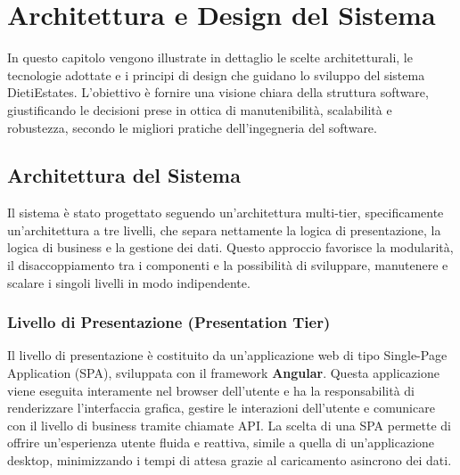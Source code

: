 \chapter{Architettura e Design del Sistema}
\label{cha:architettura_e_design_del_sistema}
In questo capitolo vengono illustrate in dettaglio le scelte architetturali, le tecnologie adottate e i principi di design che guidano lo sviluppo del sistema DietiEstates. L'obiettivo è fornire una visione chiara della struttura software, giustificando le decisioni prese in ottica di manutenibilità, scalabilità e robustezza, secondo le migliori pratiche dell'ingegneria del software.

\section{Architettura del Sistema}
\label{sec:architettura_del_sistema}
Il sistema è stato progettato seguendo un'architettura multi-tier, specificamente un'architettura a tre livelli, che separa nettamente la logica di presentazione, la logica di business e la gestione dei dati. Questo approccio favorisce la modularità, il disaccoppiamento tra i componenti e la possibilità di sviluppare, manutenere e scalare i singoli livelli in modo indipendente.

\subsection{Livello di Presentazione (Presentation Tier)}
Il livello di presentazione è costituito da un'applicazione web di tipo Single-Page Application (SPA), sviluppata con il framework \textbf{Angular}. Questa applicazione viene eseguita interamente nel browser dell'utente e ha la responsabilità di renderizzare l'interfaccia grafica, gestire le interazioni dell'utente e comunicare con il livello di business tramite chiamate API. La scelta di una SPA permette di offrire un'esperienza utente fluida e reattiva, simile a quella di un'applicazione desktop, minimizzando i tempi di attesa grazie al caricamento asincrono dei dati.

